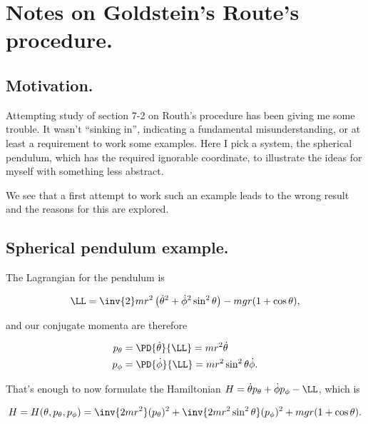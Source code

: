 %


\chapter{Notes on Goldstein's Route's procedure.}
\label{chap:goldsteinRouth}
{}
\date{Mar 3, 2010}

\beginArtNoToc

\section{Motivation.}

Attempting study of \cite{goldstein1951cm} section 7-2 on Routh's procedure has been giving me some trouble.  It wasn't ``sinking in'', indicating a fundamental misunderstanding, or at least a requirement to work some examples.  Here I pick a system, the spherical pendulum, which has the required ignorable coordinate, to illustrate the ideas for myself with something less abstract.

We see that a first attempt to work such an example leads to the wrong result and the reasons for this are explored.

\section{Spherical pendulum example.}

The Lagrangian for the pendulum is

\begin{align}\label{eqn:goldsteinRouth:1}
\LL = \inv{2} m r^2 \left( \dot{\theta}^2 + \dot{\phi}^2 \sin^2 \theta \right) - m g r ( 1 + \cos\theta ),
\end{align}

and our conjugate momenta are therefore

\begin{align}\label{eqn:goldsteinRouth:2}
p_\theta &= \PD{\dot{\theta}}{\LL} = m r^2 \dot{\theta} \\
p_\phi &= \PD{\dot{\phi}}{\LL} = m r^2 \sin^2\theta \dot{\phi}.
\end{align}

That's enough to now formulate the Hamiltonian $H = \dot{\theta} p_\theta + \dot{\phi} p_\phi - \LL$, which is

\begin{align}\label{eqn:goldsteinRouth:3}
H = H(\theta, p_\theta, p_\phi) = \inv{2 m r^2 } (p_\theta)^2 + \inv{2 m r^2 \sin^2\theta} (p_\phi)^2 + m g r ( 1 + \cos\theta ).
\end{align}

